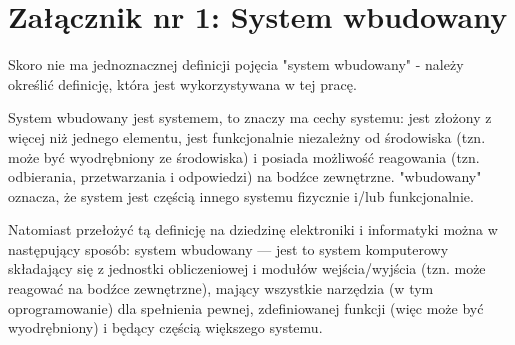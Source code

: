 \documentclass[../main]{subfiles}
\begin{document}
\section*{Załącznik nr 1: System wbudowany}\label{sec:zalacznik-1}

Skoro nie ma jednoznacznej definicji pojęcia "system wbudowany" - należy określić definicję, która jest
wykorzystywana w tej pracę.

System wbudowany jest systemem, to znaczy ma cechy systemu: jest złożony z więcej niż jednego elementu,
jest funkcjonalnie niezależny od środowiska (tzn. może być wyodrębniony ze środowiska) i posiada
możliwość reagowania (tzn. odbierania, przetwarzania i odpowiedzi) %
na bodźce zewnętrzne. "wbudowany" oznacza, że system jest częścią innego systemu fizycznie i/lub
funkcjonalnie.

Natomiast przełożyć tą definicję na dziedzinę elektroniki i informatyki można w następujący sposób:
system wbudowany — jest to system komputerowy składający się z jednostki obliczeniowej i modułów
wejścia/wyjścia (tzn. może reagować na bodźce zewnętrzne), mający wszystkie narzędzia (w tym
oprogramowanie) dla spełnienia pewnej, zdefiniowanej funkcji (więc może być wyodrębniony) i będący
częścią większego systemu.
\end{document}
